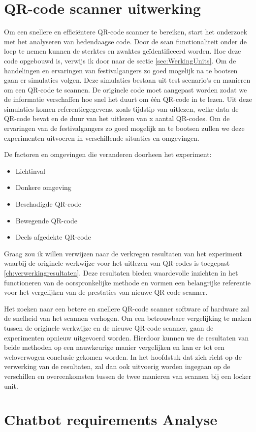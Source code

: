 \section{QR-code scanner uitwerking}%
\label{sec:scannerUitwerking}

Om een snellere en efficiëntere QR-code scanner te bereiken, start het onderzoek met het analyseren van hedendaagse code. Door de scan functionaliteit onder de loep te nemen kunnen de sterktes en zwaktes geïdentificeerd worden. Hoe deze code opgebouwd is, verwijs ik door naar de sectie \ref{sec:WerkingUnits}.
Om de handelingen en ervaringen van festivalgangers zo goed mogelijk na te bootsen gaan er simulaties volgen. Deze simulaties bestaan uit test scenario’s en manieren om een QR-code te scannen. De originele code moet aangepast worden zodat we de informatie verschaffen hoe snel het duurt om één QR-code in te lezen. Uit deze simulaties komen referentiegegevens, zoals tijdstip van uitlezen, welke data de QR-code bevat en de duur van het uitlezen van x aantal QR-codes. Om de ervaringen van de festivalgangers zo goed mogelijk na te bootsen zullen we deze experimenten uitvoeren in verschillende situaties en omgevingen.

De factoren en omgevingen die veranderen doorheen het experiment:

\begin{itemize}
    \item Lichtinval
    \item Donkere omgeving
    \item Beschadigde QR-code
    \item Bewegende QR-code
    \item Deels afgedekte QR-code
\end{itemize}


Graag zou ik willen verwijzen naar de verkregen resultaten van het experiment waarbij de originele werkwijze voor het uitlezen van QR-codes is toegepast \ref{ch:verwerkingresultaten}. Deze resultaten bieden waardevolle inzichten in het functioneren van de oorspronkelijke methode en vormen een belangrijke referentie voor het vergelijken van de prestaties van nieuwe QR-code scanner.

Het zoeken naar een betere en snellere QR-code scanner software of hardware zal de snelheid van het scannen verhogen. Om een betrouwbare vergelijking te maken tussen de originele werkwijze en de nieuwe QR-code scanner, gaan de experimenten opnieuw uitgevoerd worden. Hierdoor kunnen we de resultaten van beide methoden op een nauwkeurige manier vergelijken en kan er tot een weloverwogen conclusie gekomen worden. In het hoofdstuk dat zich richt op de verwerking van de resultaten, zal dan ook uitvoerig worden ingegaan op de verschillen en overeenkomsten tussen de twee manieren van scannen bij een locker unit.

\section{Chatbot requirements Analyse}%
\label{sec:chatbotRequirment}







